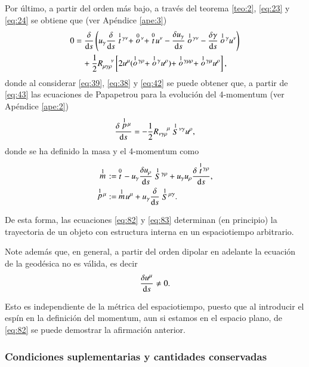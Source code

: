 Por último, a partir del orden más bajo, a través del teorema \ref{teo:2}, \eqref{eq:23} y \eqref{eq:24} se obtiene que (ver Apéndice \ref{ape:3})
\begin{align}
\label{eq:43}
0 &= \cd{} \left( u_{\gamma} \cd{} \des{1}{t}^{\gamma \nu} + \des{0}{o}^{\nu} + \des{0}{t} u^{\nu} - \cd{u_{\gamma}} \des{1}{o}^{\gamma \nu} - \cd{\gamma} \des{1}{o}^{\gamma}u^{\nu} \right) \nonumber \\
& \quad + \frac{1}{2} R^{\ \ \ \ \nu}_{\mu \gamma \rho} \left[ 2u^{\mu}(\des{1}{o}^{\gamma \rho} + \des{1}{o}^{\gamma} u^{\rho}) + \des{1}{o}^{\gamma \mu \rho} + \des{1}{o}^{\gamma \mu}  u^{\rho}  \right],
\end{align}
donde al considerar \eqref{eq:39}, \eqref{eq:38} y \eqref{eq:42} se puede obtener que, a partir de \eqref{eq:43} las ecuaciones de Papapetrou para la evolución del 4-momentum (ver Apéndice \ref{ape:2})
\begin{equation}
\label{eq:82}
\frac{\delta \stackrel{1}{p}{\!}^{\mu}}{\mathrm{d}s} = -\frac{1}{2} R^{\ \ \ \ \mu}_{\nu \gamma \rho} \stackrel{1}{S}{\!}^{\nu \gamma} u^{\rho},
\end{equation}
donde se ha definido la masa y el 4-momentum como
\begin{align}
\stackrel{1}{m}{\!} &:=\ \stackrel{0}{t}{\!} - u_{\gamma} \frac{\delta u_{\rho}}{\mathrm{d}s} \stackrel{1}{S}{\!}^{\gamma \rho} + u_{\gamma} u_{\rho} \frac{\delta \stackrel{1}{t}{\!}^{\gamma \rho}}{\mathrm{d}s},\\
\label{eq:44}
\stackrel{1}{p}{\!}^{\mu} &:=\ \stackrel{1}{m}{\!} u^{\mu} + u_{\gamma} \frac{\delta }{\mathrm{d}s} \stackrel{1}{S}{\!}^{\mu \gamma}.
\end{align}

De esta forma, las ecuaciones \eqref{eq:82} y \eqref{eq:83} determinan (en principio) la trayectoria de un objeto con estructura interna en un espaciotiempo arbitrario.

Note además que, en general, a partir del orden dipolar en adelante la ecuación de la geodésica no es válida, es decir
\begin{equation}
\frac{\delta u^{\mu}}{\mathrm{d}s} \neq 0.
\end{equation}

Esto es independiente de la métrica del espaciotiempo, puesto que al introducir el espín en la definición del momentum, aun si estamos en el espacio plano, de \eqref{eq:82} se puede demostrar la afirmación anterior.

\subsubsection{Condiciones suplementarias y cantidades conservadas}

